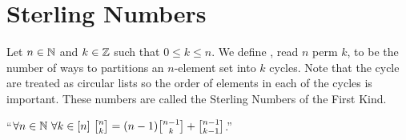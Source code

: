     \section{Sterling Numbers}
        \begin{definition}
            Let $n \in \mathbb{N}$ and $k \in \mathbb{Z}$ such that $0 \le k \le n$. We define
            , read $n$ perm $k$, to be the number of ways to partitions
            an $n$-element set into $k$ cycles. Note that the cycle are treated as circular
            lists so the order of elements in each of the cycles is important. These numbers are
            called the Sterling Numbers of the First Kind.
        \end{definition}
        \begin{theorem}
            ``$\forall n \in \set{N} \ \forall k \in [n] \ \npermk{n}{k} = (n - 1) \npermk{n - 1}{k} + \npermk{n - 1}{k - 1}$.''
        \end{theorem}
